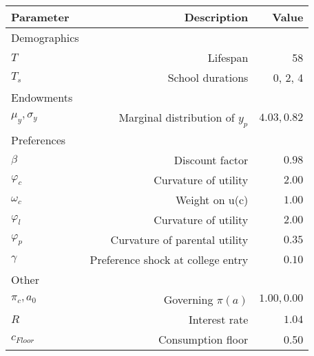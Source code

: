\begin{tabular}{lrr}
\hline
Parameter & Description  & Value  \\
\hline
Demographics &   &   \\
$T$ & Lifespan  & 58  \\
$T_{s}$ & School durations  & 0, 2, 4  \\
Endowments &   &   \\
$\mu_{y}, \sigma_{y}$ & Marginal distribution of $y_{p}$  & $4.03, 0.82$  \\
Preferences &   &   \\
$\beta$ & Discount factor  & $0.98$  \\
$\varphi_{c}$ & Curvature of utility  & $2.00$  \\
$\omega_{c}$ & Weight on u(c)  & $1.00$  \\
$\varphi_{l}$ & Curvature of utility  & $2.00$  \\
$\varphi_{p}$ & Curvature of parental utility  & $0.35$  \\
$\gamma$ & Preference shock at college entry  & $0.10$  \\
Other &   &   \\
$\pi_{c}, a_{0}$ & Governing $\pi(a)$  & $1.00, 0.00$  \\
$R$ & Interest rate  & $1.04$  \\
$c_{Floor}$ & Consumption floor  & 0.50  \\
\hline
\end{tabular}%
